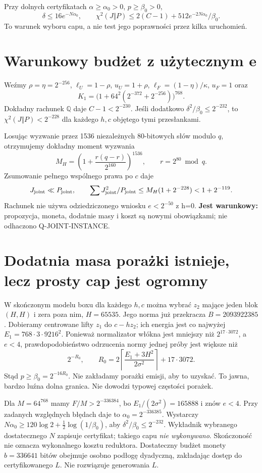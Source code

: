 \documentclass[11pt,a4paper]{article}
\begin{document}
Przy dolnych certyfikatach $\alpha\ge\alpha_0>0$, $p\ge\beta_0>0$,
\[
 \delta\le16e^{-N\alpha_0},\qquad
 \chi^2(J\Vert P)\le2(C-1)+512e^{-2N\alpha_0}/\beta_0.
\]
To warunek wyboru capu, a nie test jego poprawności przez kilka uruchomień.

\section{Warunkowy budżet z użytecznym e}
Weźmy $\rho=\eta=2^{-256}$, $\ell_U=1-\rho$, $u_U=1+\rho$,
$\ell_F=(1-\eta)/\kappa$, $u_F=1$ oraz
\[
 K_1=\bigl(1+64^2(2^{-372}+2^{-256})\bigr)^{768}.
\]
Dokładny rachunek $\mathbb Q$ daje $C-1<2^{-230}$.
Jeśli dodatkowo $\delta^2/\beta_0\le2^{-232}$, to
$\chi^2(J\Vert P)<2^{-228}$ dla każdego $h,c$ objętego tymi przesłankami.

Losując wyzwanie przez 1536 niezależnych 80-bitowych słów modulo $q$,
otrzymujemy dokładny moment wyzwania
\[
 M_H=\left(1+\frac{r(q-r)}{2^{160}}\right)^{1536},\qquad r=2^{80}\bmod q.
\]
Zsumowanie pełnego wspólnego prawa po $c$ daje
\[
 J_{\rm joint}\ll P_{\rm joint},\qquad
 \sum J_{\rm joint}^2/P_{\rm joint}
 \le M_H(1+2^{-228})<1+2^{-119}.
\]
Rachunek nie używa odziedziczonego wniosku $e<2^{-50}$ z h=0.
\textbf{Jest warunkowy:} propozycja, moneta, dodatnie masy i koszt są
nowymi obowiązkami; nie odhaczono Q-JOINT-INSTANCE.

\section{Dodatnia masa porażki istnieje, lecz prosty cap jest ogromny}
W skończonym modelu boxu dla każdego $h,c$ można wybrać $z_2$ mające
jeden blok $(H,H)$ i zera poza nim, $H=65535$. Jego norma już przekracza
$B=2093922385$. Dobieramy centrowane lifty $z_1$ do $c-hz_2$;
ich energia jest co najwyżej $E_1=768\cdot3\cdot9216^2$.
Ponieważ normalizator włókna jest mniejszy niż $2^{17\cdot3072}$,
a $e<4$, prawdopodobieństwo odrzucenia normy jednej próby jest większe niż
\[
 2^{-R_0},\qquad
 R_0=2\left\lceil\frac{E_1+3H^2}{2\sigma^2}\right\rceil+17\cdot3072.
\]
Stąd $p\ge\beta_0=2^{-16R_0}$. Nie zakładamy porażki emisji, aby to uzyskać.
To jawna, bardzo luźna dolna granica. Nie dowodzi typowej częstości porażek.

Dla $M=64^{768}$ mamy $F/M>2^{-336384}$, bo
$E_1/(2\sigma^2)=165888$ i znów $e<4$.
Przy zadanych względnych błędach daje to $\alpha_0=2^{-336385}$.
Wystarczy $N\alpha_0\ge120\log2+\tfrac12\log(1/\beta_0)$, aby
$\delta^2/\beta_0\le2^{-232}$.
Wykładnik wybranego dostatecznego $N$ zapisuje certyfikat; takiego capu
\emph{nie wykonywano}. Skończoność nie oznacza wykonalnego kosztu reduktora.
Dostateczny budżet monety $b=336641$ bitów obejmuje osobno podłogę dyadyczną,
zakładając dostęp do certyfikowanego $L$. Nie rozwiązuje generowania $L$.
\end{document}
